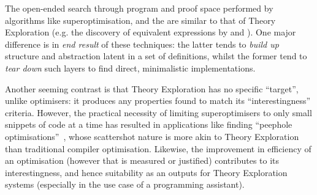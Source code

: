 The open-ended search through program and proof space performed by algorithms
like superoptimisation, \hsearch{} and the \goedelmachine{} are similar to that
of Theory Exploration (e.g. the discovery of equivalent expressions by
\isacosy{} and \quickspec{}). One major difference is in \emph{end result} of
these techniques: the latter tends to \emph{build up} structure and abstraction
latent in a set of definitions, whilst the former tend to \emph{tear down} such
layers to find direct, minimalistic implementations.

Another seeming contrast is that Theory Exploration has no specific ``target'',
unlike optimisers: it produces any properties found to match its
``interestingness'' criteria. However, the practical necessity of limiting
superoptimisers to only small snippets of code at a time has resulted in
applications like finding ``peephole optimisations''~\cite{Bansal.Aiken:2006},
whose scattershot nature is more akin to Theory Exploration than traditional
compiler optimisation. Likewise, the improvement in efficiency of an
optimisation (however that is measured or justified) contributes to its
interestingness, and hence suitability as an outputs for Theory Exploration
systems (especially in the use case of a programming assistant).

